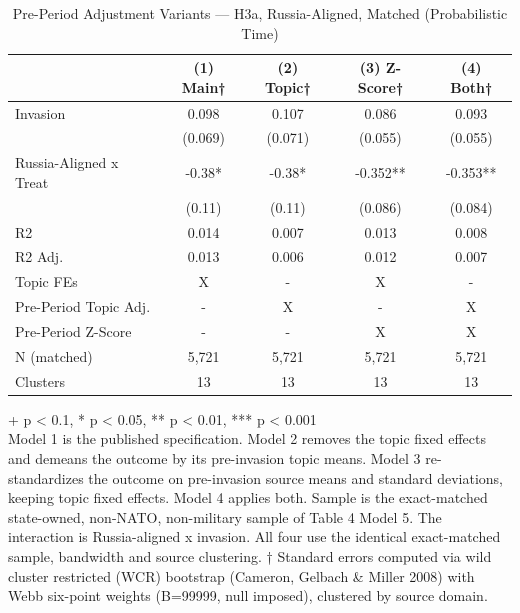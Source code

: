 \begin{table}[t]
\caption{\label{tab:s15b}Pre-Period Adjustment Variants — H3a, Russia-Aligned, Matched (Probabilistic Time)}
\fontsize{12.0pt}{14.0pt}\selectfont
\begin{tabular*}{\linewidth}{@{\extracolsep{\fill}}lcccc}
\toprule
  & (1) Main† & (2) Topic† & (3) Z-Score† & (4) Both† \\ 
\midrule\addlinespace[2.5pt]
Invasion & 0.098 & 0.107 & 0.086 & 0.093 \\ 
 & (0.069) & (0.071) & (0.055) & (0.055) \\ 
Russia-Aligned x Treat & -0.38* & -0.38* & -0.352** & -0.353** \\ 
{} & {(0.11)} & {(0.11)} & {(0.086)} & {(0.084)} \\ 
R2 & 0.014 & 0.007 & 0.013 & 0.008 \\ 
R2 Adj. & 0.013 & 0.006 & 0.012 & 0.007 \\ 
Topic FEs & X & - & X & - \\ 
Pre-Period Topic Adj. & - & X & - & X \\ 
Pre-Period Z-Score & - & - & X & X \\ 
N (matched) & 5,721 & 5,721 & 5,721 & 5,721 \\ 
Clusters & 13 & 13 & 13 & 13 \\ 
\bottomrule
\end{tabular*}
\begin{minipage}{\linewidth}
\vspace{.05em}
+ p < 0.1, * p < 0.05, ** p < 0.01, *** p < 0.001\\
Model 1 is the published specification. Model 2 removes the topic fixed effects
and demeans the outcome by its pre-invasion topic means. Model 3 re-standardizes
the outcome on pre-invasion source means and standard deviations, keeping
topic fixed effects. Model 4 applies both. Sample is the exact-matched
state-owned, non-NATO, non-military sample of Table 4 Model 5. The interaction
is Russia-aligned x invasion. All four use the identical exact-matched sample,
bandwidth and source clustering. † Standard errors computed via wild cluster
restricted (WCR) bootstrap (Cameron, Gelbach \& Miller 2008) with Webb six-point
weights (B=99999, null imposed), clustered by source domain.\\
\end{minipage}
\end{table}

